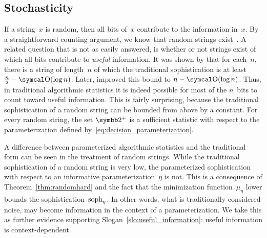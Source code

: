 \subsection{Stochasticity}
\label{sec:statistics:stochasticity}%
If a string~$x$ is random, then all bits of~$x$ contribute to the information in~$x$.
By a straightforward counting argument, we know that random strings exist~\parencite{li2008introduction}.
A related question that is not as easily answered, is whether or not strings exist of which all bits contribute to \emph{useful} information.
It was shown by \textcite{shen1983concept} that for each~$n$, there is a string of length~$n$ of which the traditional sophistication is at least $\frac{n}{2} - \bigO(\log n)$.
Later, \textcite{gacs2001algorithmic} improved this bound to $n - \bigO(\log n)$.
Thus, in traditional algorithmic statistics it is indeed possible for most of the $n$~bits to count toward useful information.
This is fairly surprising, because the traditional sophistication of a random string can be bounded from above by a constant.
For every random string, the set $\binary^+$ is a sufficient statistic with respect to the parameterization defined by~\eqref{eq:decision_parameterization}.

A difference between parameterized algorithmic statistics and the traditional form can be seen in the treatment of random strings.
While the traditional sophistication of a random string is very low, the parameterized sophistication with respect to an informative parameterization~$\eta$ is not.
This is a consequence of Theorem~\ref{thm:randomhard} and the fact that the minimization function~$\mu_\eta$ lower bounds the sophistication~$\operatorname{soph}_\eta$.
In other words, what is traditionally considered noise, may become information in the context of a parameterization.
We take this as further evidence supporting Slogan~\ref{slo:useful_information}: useful information is context-dependent.

